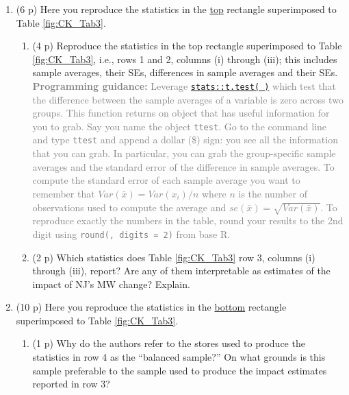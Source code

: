 \documentclass{article}
\begin{document}
\begin{enumerate}[label=\textbf{Q\arabic{enumi}}.,ref=Q\arabic{enumi}, wide=0pt, itemsep=0em, topsep=5pt, labelindent=0pt, resume]
\item (6 p) Here you reproduce the statistics in the \underline{top} rectangle superimposed to Table \ref{fig:CK_Tab3}.\label{item:table3-rows-1-2}
\begin{enumerate}
\item (4 p) Reproduce the statistics in the top rectangle superimposed to Table \ref{fig:CK_Tab3},  i.e., rows 1 and 2, columns (i) through (iii); this includes sample averages, their SEs, differences in sample averages and their SEs. \textcolor{gray}{\textbf{Programming guidance:} Leverage \href{https://www.rdocumentation.org/packages/stats/versions/3.6.2/topics/t.test}{\texttt{stats::t.test( )}} which test that the difference between the sample averages of a variable is zero across two groups. This function returns on object that has useful information for you to grab. Say you name the object \texttt{ttest}. Go to the command line and type \texttt{ttest} and append a dollar (\$) sign: you see all the information that you can grab. In particular, you can grab the group-specific sample averages and the standard error of the difference in sample averages. To compute the standard error of each sample average you want to remember that $Var(\bar{x})=Var(x_i)/n$ where $n$ is the number of observations used to compute the average and $se(\bar{x})=\sqrt{Var(\bar{x})}$. To reproduce exactly the numbers in the table, round your results to the 2nd digit using \texttt{round(, digits = 2)} from base R. }
\item (2 p) Which statistics does Table \ref{fig:CK_Tab3} row 3, columns (i) through (iii), report? Are any of them interpretable as estimates of the impact of NJ's MW change? Explain.
\end{enumerate}
\item (10 p) Here you reproduce the statistics in the \underline{bottom} rectangle superimposed to Table \ref{fig:CK_Tab3}.\label{item:table3-rows-4-5} 
\begin{enumerate}
\item (1 p) Why do the authors refer to the stores used to produce the statistics in row 4 as the ``balanced sample?'' On what grounds is this sample preferable to the sample used to produce the impact estimates reported in row 3?

\end{enumerate}
\end{enumerate}
\end{document}
